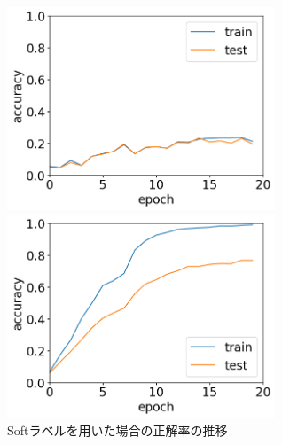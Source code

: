 \documentclass[11pt,a4paper,uplatex]{ujarticle}
\begin{document}
  \begin{figure}[tbp]
    \begin{minipage}[b]{0.495\textwidth}
      \centering
      \includegraphics[keepaspectratio, width=80mm]{Images/python/acc_202402051931.png}
    \end{minipage}
    \begin{minipage}[b]{0.495\textwidth}
      \centering
      \includegraphics[keepaspectratio, width=80mm]{Images/python/acc_202402052150.png}
    \end{minipage}
    \caption{Softラベルを用いた場合の正解率の推移}
  \end{figure}
\end{document}
